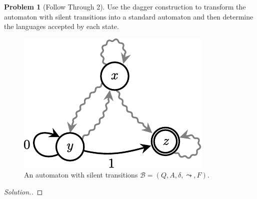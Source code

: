 \documentclass[11pt]{article}
\theoremstyle{theorem} %
\theoremstyle{definition} %
\newtheorem{problem}                    {{\color{BurntOrange}Problem}}
\theoremstyle{remark} %
\begin{document}
\begin{problem}
    [Follow Through 2]
    Use the dagger construction to transform the automaton with silent transitions into a standard automaton and then determine the languages accepted by each state.

    \begin{figure}[h]
        \centering
        \includegraphics{silent_transition_problem.pdf}
        \caption{An automaton with silent transitions \(\mathcal B = (Q, A, \delta, \leadsto, F)\).}
    \end{figure}
\end{problem}

\begin{proof}[Solution.]
    
\end{proof}
\end{document}
